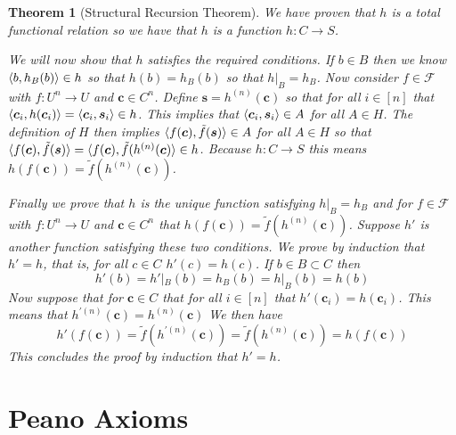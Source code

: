 \documentclass[12pt]{article}
\theoremstyle{break}
\theoremstyle{break}
\newtheorem{theorem}{Theorem}[section]
\theoremstyle{break}
\theoremstyle{break}
\theoremstyle{break}
\newtheorem{informal definition}[definition]{Informal Definition}
\newcommand{\bv}[1]{\boldsymbol{#1}}
\begin{document}
\begin{theorem}[Structural Recursion Theorem]
We have proven that $h$ is a total functional relation so we have that $h$ is a function $h:C\to S$.

We will now show that $h$ satisfies the required conditions.
If $b\in B$ then we know $\braket{b, h_B(b)} \in h$ so that $h(b) = h_B(b)$ so that $h|_B = h_B$.
Now consider $f\in \mathcal{F}$ with $f:U^n \to U$ and $\bv{c} \in C^n$.
Define $\bv{s} = h^{(n)}(\bv{c})$ so that for all $i \in [n]$ that $\braket{\bv{c}_i, h(\bv{c}_i)} = \braket{\bv{c}_i, \bv{s}_i} \in h$.
This implies that $\braket{\bv{c}_i, \bv{s}_i} \in A$ for all $A\in H$.
The definition of $H$ then implies $\braket{f(\bv{c}), \tilde{f}(\bv{s})} \in A$ for all $A\in H$ so that $\braket{f(\bv{c}), \tilde{f}(\bv{s})} = \braket{f(\bv{c}), \tilde{f}(h^{(n)}(\bv{c})} \in h$.
Because $h:C \to S$ this means $h(f(\bv{c})) = \tilde{f}(h^{(n)}(\bv{c}))$.

Finally we prove that $h$ is the unique function satisfying $h|_B = h_B$ and for $f\in \mathcal{F}$ with $f:U^n \to U$ and $\bv{c}\in C^n$ that $h(f(\bv{c})) = \tilde{f}(h^{(n)}(\bv{c}))$.
Suppose $h'$ is another function satisfying these two conditions.
We prove by induction that $h' = h$, that is, for all $c\in C$ $h'(c) = h(c)$.
If $b\in B \subset C$ then
$$
h'(b) = h'|_B(b) = h_B(b) = h|_B(b) = h(b)
$$
Now suppose that for $\bv{c} \in C$ that for all $i\in [n]$ that $h'(\bv{c}_i) = h(\bv{c}_i)$.
This means that $h^{'(n)}(\bv{c}) = h^{(n)}(\bv{c})$
We then have
$$
h'(f(\bv{c})) = \tilde{f}(h^{'(n)}(\bv{c})) = \tilde{f}(h^{(n)}(\bv{c})) = h(f(\bv{c}))
$$
This concludes the proof by induction that $h'=h$.
\end{theorem}

\section{Peano Axioms}
\end{document}

